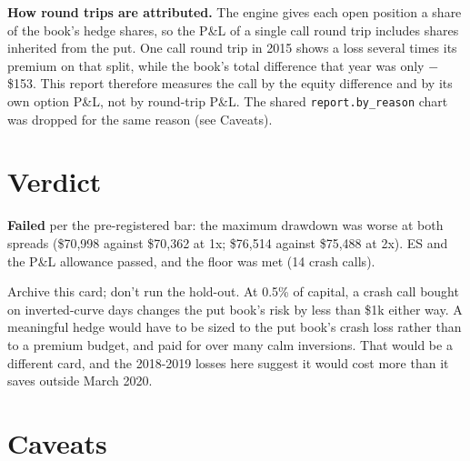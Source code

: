 \documentclass{article}
\begin{document}
\textbf{How round trips are attributed.} The engine gives each open position a share of the book's hedge shares, so the P\&L of a single call round trip includes shares inherited from the put. One call round trip in 2015 shows a loss several times its premium on that split, while the book's total difference that year was only \ensuremath{-}\$153. This report therefore measures the call by the equity difference and by its own option P\&L, not by round-trip P\&L. The shared \texttt{report.\allowbreak{}by\_\allowbreak{}reason} chart was dropped for the same reason (see Caveats).

\section{Verdict}

\textbf{Failed} per the pre-registered bar: the maximum drawdown was worse at both spreads (\$70,998 against \$70,362 at 1x; \$76,514 against \$75,488 at 2x). ES and the P\&L allowance passed, and the floor was met (14 crash calls).

Archive this card; don't run the hold-out. At 0.5\% of capital, a crash call bought on inverted-curve days changes the put book's risk by less than \$1k either way. A meaningful hedge would have to be sized to the put book's crash loss rather than to a premium budget, and paid for over many calm inversions. That would be a different card, and the 2018-2019 losses here suggest it would cost more than it saves outside March 2020.

\section{Caveats}
\end{document}

